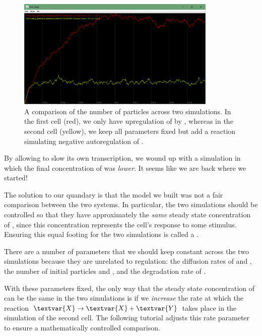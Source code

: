 \begin{figure}[h]
\centering
\mySfFamily
\includegraphics[width = 0.85\textwidth]{../images/nar_unequal_chart.png}
\caption{A comparison of the number of  particles across two simulations. In the first cell (red), we only have upregulation of  by , whereas in the second cell (yellow), we keep all parameters fixed but add a reaction simulating negative autoregulation of .}
\label{fig:nar_unequal_chart}
\end{figure}

By allowing  to slow its own transcription, we wound up with a simulation in which the final concentration of  was \textit{lower}. It seems like we are back where we started!

The solution to our quandary is that the model we built was not a fair comparison between the two systems. In particular, the two simulations should be controlled so that they have approximately the \textit{same} steady state concentration of , since this concentration represents the cell's response to some stimulus. Ensuring this equal footing for the two simulations is called a .\\

\begin{qbox}\end{qbox}

There are a number of parameters that we should keep constant across the two simulations because they are unrelated to regulation: the diffusion rates of  and , the number of initial particles  and , and the degradation rate of .

With these parameters fixed, the only way that the steady state concentration of  can be the same in the two simulations is if we \textit{increase} the rate at which the reaction $\textvar{X} \rightarrow \textvar{X} + \textvar{Y}$ takes place in the simulation of the second cell. The following tutorial adjusts this rate parameter to ensure a mathematically controlled comparison.

